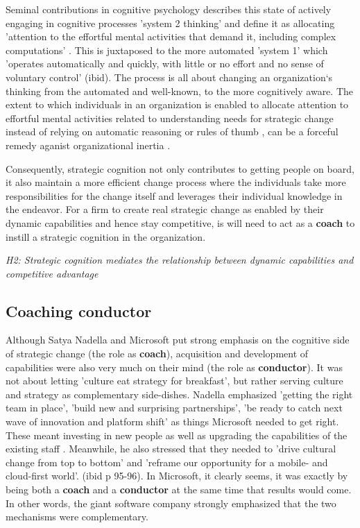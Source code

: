 \documentclass[review,fleqn]{elsarticle}\usepackage[]{graphicx}\usepackage[]{color}
\begin{document}
Seminal contributions in cognitive psychology describes this state of actively engaging in
cognitive processes 'system 2 thinking' and define it as allocating 'attention to the
effortful mental activities that demand it, including complex computations'
\cite[p. 21]{Kahneman2011}. This is juxtaposed to the more automated 'system 1' which
'operates automatically and quickly, with little or no effort and no sense of voluntary
control' (ibid). The process is all about changing an organization`s thinking from the
automated and well-known, to the more cognitively aware. The extent to which individuals
in an organization is enabled to allocate attention to effortful mental activities related
to understanding needs for strategic change instead of relying on automatic reasoning
\citep{Tversky1983} or rules of thumb \citep{Kahneman1979}, can be a forceful remedy
aganist organizational inertia \citep{Adriaenssen2016}.

Consequently, strategic cognition not only contributes to getting people on board, it also
maintain a more efficient change process where the individuals take more responsibilities
for the change itself and leverages their individual knowledge in the endeavor. For a firm
to create real strategic change as enabled by their dynamic capabilities and hence stay
competitive, is will need to act as a {\bf coach} to instill a strategic cognition in the
organization.

\emph{H2: Strategic cognition mediates the relationship between dynamic capabilities and
  competitive advantage}

\subsection*{Coaching conductor}

Although Satya Nadella and Microsoft put strong emphasis on the cognitive side of
strategic change (the role as {\bf coach}), acquisition and development of capabilities
were also very much on their mind (the role as {\bf conductor}). It was not about letting
'culture eat strategy for breakfast', but rather serving culture and strategy as
complementary side-dishes. Nadella emphasized 'getting the right team in place', 'build
new and surprising partnerships', 'be ready to catch next wave of innovation and platform
shift' as things Microsoft needed to get right. These meant investing in new people as
well as upgrading the capabilities of the existing staff \cite{Nadella2017}. Meanwhile, he
also stressed that they needed to 'drive cultural change from top to bottom' and 'reframe
our opportunity for a mobile- and cloud-first world'. (ibid p 95-96). In Microsoft, it
clearly seems, it was exactly by being both a {\bf coach} and a {\bf conductor} at the
same time that results would come. In other words, the giant software company strongly
emphasized that the two mechanisms were complementary.
\end{document}
